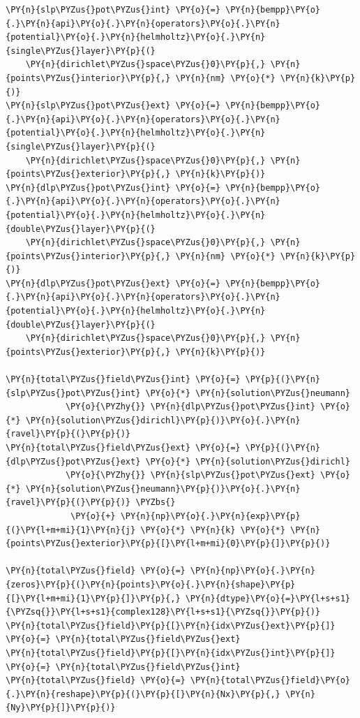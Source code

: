 \begin{tcolorbox}
\begin{Verbatim}[commandchars=\\\{\}]
\PY{n}{slp\PYZus{}pot\PYZus{}int} \PY{o}{=} \PY{n}{bempp}\PY{o}{.}\PY{n}{api}\PY{o}{.}\PY{n}{operators}\PY{o}{.}\PY{n}{potential}\PY{o}{.}\PY{n}{helmholtz}\PY{o}{.}\PY{n}{single\PYZus{}layer}\PY{p}{(}
	\PY{n}{dirichlet\PYZus{}space\PYZus{}0}\PY{p}{,} \PY{n}{points\PYZus{}interior}\PY{p}{,} \PY{n}{nm} \PY{o}{*} \PY{n}{k}\PY{p}{)}
\PY{n}{slp\PYZus{}pot\PYZus{}ext} \PY{o}{=} \PY{n}{bempp}\PY{o}{.}\PY{n}{api}\PY{o}{.}\PY{n}{operators}\PY{o}{.}\PY{n}{potential}\PY{o}{.}\PY{n}{helmholtz}\PY{o}{.}\PY{n}{single\PYZus{}layer}\PY{p}{(}
	\PY{n}{dirichlet\PYZus{}space\PYZus{}0}\PY{p}{,} \PY{n}{points\PYZus{}exterior}\PY{p}{,} \PY{n}{k}\PY{p}{)}
\PY{n}{dlp\PYZus{}pot\PYZus{}int} \PY{o}{=} \PY{n}{bempp}\PY{o}{.}\PY{n}{api}\PY{o}{.}\PY{n}{operators}\PY{o}{.}\PY{n}{potential}\PY{o}{.}\PY{n}{helmholtz}\PY{o}{.}\PY{n}{double\PYZus{}layer}\PY{p}{(}
	\PY{n}{dirichlet\PYZus{}space\PYZus{}0}\PY{p}{,} \PY{n}{points\PYZus{}interior}\PY{p}{,} \PY{n}{nm} \PY{o}{*} \PY{n}{k}\PY{p}{)}
\PY{n}{dlp\PYZus{}pot\PYZus{}ext} \PY{o}{=} \PY{n}{bempp}\PY{o}{.}\PY{n}{api}\PY{o}{.}\PY{n}{operators}\PY{o}{.}\PY{n}{potential}\PY{o}{.}\PY{n}{helmholtz}\PY{o}{.}\PY{n}{double\PYZus{}layer}\PY{p}{(}
	\PY{n}{dirichlet\PYZus{}space\PYZus{}0}\PY{p}{,} \PY{n}{points\PYZus{}exterior}\PY{p}{,} \PY{n}{k}\PY{p}{)}
         
\PY{n}{total\PYZus{}field\PYZus{}int} \PY{o}{=} \PY{p}{(}\PY{n}{slp\PYZus{}pot\PYZus{}int} \PY{o}{*} \PY{n}{solution\PYZus{}neumann} 
			\PY{o}{\PYZhy{}} \PY{n}{dlp\PYZus{}pot\PYZus{}int} \PY{o}{*} \PY{n}{solution\PYZus{}dirichl}\PY{p}{)}\PY{o}{.}\PY{n}{ravel}\PY{p}{(}\PY{p}{)}
\PY{n}{total\PYZus{}field\PYZus{}ext} \PY{o}{=} \PY{p}{(}\PY{n}{dlp\PYZus{}pot\PYZus{}ext} \PY{o}{*} \PY{n}{solution\PYZus{}dirichl} 
			\PY{o}{\PYZhy{}} \PY{n}{slp\PYZus{}pot\PYZus{}ext} \PY{o}{*} \PY{n}{solution\PYZus{}neumann}\PY{p}{)}\PY{o}{.}\PY{n}{ravel}\PY{p}{(}\PY{p}{)} \PYZbs{}
             \PY{o}{+} \PY{n}{np}\PY{o}{.}\PY{n}{exp}\PY{p}{(}\PY{l+m+mi}{1}\PY{n}{j} \PY{o}{*} \PY{n}{k} \PY{o}{*} \PY{n}{points\PYZus{}exterior}\PY{p}{[}\PY{l+m+mi}{0}\PY{p}{]}\PY{p}{)}
         
\PY{n}{total\PYZus{}field} \PY{o}{=} \PY{n}{np}\PY{o}{.}\PY{n}{zeros}\PY{p}{(}\PY{n}{points}\PY{o}{.}\PY{n}{shape}\PY{p}{[}\PY{l+m+mi}{1}\PY{p}{]}\PY{p}{,} \PY{n}{dtype}\PY{o}{=}\PY{l+s+s1}{\PYZsq{}}\PY{l+s+s1}{complex128}\PY{l+s+s1}{\PYZsq{}}\PY{p}{)}
\PY{n}{total\PYZus{}field}\PY{p}{[}\PY{n}{idx\PYZus{}ext}\PY{p}{]} \PY{o}{=} \PY{n}{total\PYZus{}field\PYZus{}ext}
\PY{n}{total\PYZus{}field}\PY{p}{[}\PY{n}{idx\PYZus{}int}\PY{p}{]} \PY{o}{=} \PY{n}{total\PYZus{}field\PYZus{}int}
\PY{n}{total\PYZus{}field} \PY{o}{=} \PY{n}{total\PYZus{}field}\PY{o}{.}\PY{n}{reshape}\PY{p}{(}\PY{p}{[}\PY{n}{Nx}\PY{p}{,} \PY{n}{Ny}\PY{p}{]}\PY{p}{)}
\end{Verbatim}
\end{tcolorbox}

